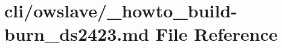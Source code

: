 \hypertarget{__howto__build-burn__ds2423_8md}{\section{cli/owslave/\-\_\-howto\-\_\-build-\/burn\-\_\-ds2423.md File Reference}
\label{__howto__build-burn__ds2423_8md}
}
